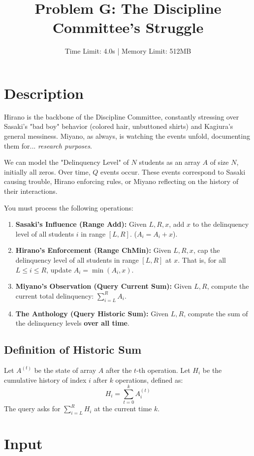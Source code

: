 \documentclass[11pt, letterpaper]{article}
\title{\textbf{Problem G: The Discipline Committee's Struggle}}
\author{Time Limit: 4.0s | Memory Limit: 512MB}
\date{}
\begin{document}
\maketitle

\section*{Description}

Hirano is the backbone of the Discipline Committee, constantly stressing over Sasaki's "bad boy" behavior (colored hair, unbuttoned shirts) and Kagiura's general messiness. Miyano, as always, is watching the events unfold, documenting them for... \textit{research purposes}.

We can model the "Delinquency Level" of $N$ students as an array $A$ of size $N$, initially all zeros.
Over time, $Q$ events occur. These events correspond to Sasaki causing trouble, Hirano enforcing rules, or Miyano reflecting on the history of their interactions.

You must process the following operations:

\begin{enumerate}
    \item \textbf{Sasaki's Influence (Range Add):} Given $L, R, x$, add $x$ to the delinquency level of all students $i$ in range $[L, R]$. ($A_i = A_i + x$).
    \item \textbf{Hirano's Enforcement (Range ChMin):} Given $L, R, x$, cap the delinquency level of all students in range $[L, R]$ at $x$. That is, for all $L \le i \le R$, update $A_i = \min(A_i, x)$.
    \item \textbf{Miyano's Observation (Query Current Sum):} Given $L, R$, compute the current total delinquency: $\sum_{i=L}^{R} A_i$.
    \item \textbf{The Anthology (Query Historic Sum):} Given $L, R$, compute the sum of the delinquency levels \textbf{over all time}.
\end{enumerate}

\subsection*{Definition of Historic Sum}
Let $A^{(t)}$ be the state of array $A$ after the $t$-th operation.
Let $H_i$ be the cumulative history of index $i$ after $k$ operations, defined as:
$$ H_i = \sum_{t=0}^{k} A_i^{(t)} $$
The query asks for $\sum_{i=L}^{R} H_i$ at the current time $k$.

\section*{Input}
\end{document}
